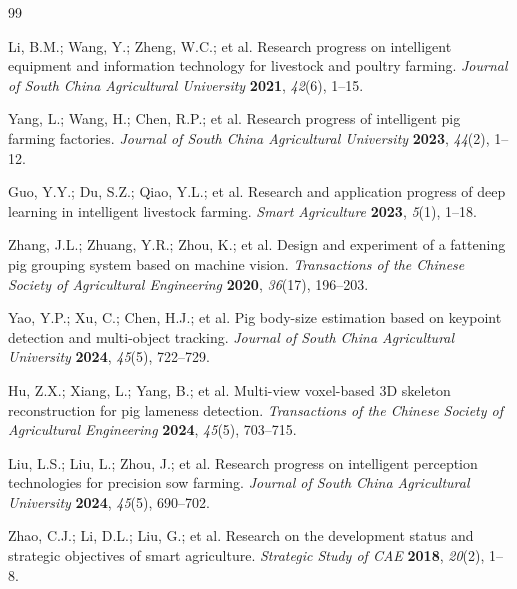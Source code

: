 \documentclass[computers,article,submit,pdftex,moreauthors]{mdpi}
\begin{document}




\begin{thebibliography}{99}

 Li, B.M.; Wang, Y.; Zheng, W.C.; et al. Research progress on intelligent equipment and information technology for livestock and poultry farming. \textit{Journal of South China Agricultural University} \textbf{2021}, \textit{42}(6), 1--15.

 Yang, L.; Wang, H.; Chen, R.P.; et al. Research progress of intelligent pig farming factories. \textit{Journal of South China Agricultural University} \textbf{2023}, \textit{44}(2), 1--12.

 Guo, Y.Y.; Du, S.Z.; Qiao, Y.L.; et al. Research and application progress of deep learning in intelligent livestock farming. \textit{Smart Agriculture} \textbf{2023}, \textit{5}(1), 1--18.

 Zhang, J.L.; Zhuang, Y.R.; Zhou, K.; et al. Design and experiment of a fattening pig grouping system based on machine vision. \textit{Transactions of the Chinese Society of Agricultural Engineering} \textbf{2020}, \textit{36}(17), 196--203.

 Yao, Y.P.; Xu, C.; Chen, H.J.; et al. Pig body-size estimation based on keypoint detection and multi-object tracking. \textit{Journal of South China Agricultural University} \textbf{2024}, \textit{45}(5), 722--729.

 Hu, Z.X.; Xiang, L.; Yang, B.; et al. Multi-view voxel-based 3D skeleton reconstruction for pig lameness detection. \textit{Transactions of the Chinese Society of Agricultural Engineering} \textbf{2024}, \textit{45}(5), 703--715.

 Liu, L.S.; Liu, L.; Zhou, J.; et al. Research progress on intelligent perception technologies for precision sow farming. \textit{Journal of South China Agricultural University} \textbf{2024}, \textit{45}(5), 690--702.

 Zhao, C.J.; Li, D.L.; Liu, G.; et al. Research on the development status and strategic objectives of smart agriculture. \textit{Strategic Study of CAE} \textbf{2018}, \textit{20}(2), 1--8.


\end{thebibliography}
\end{document}
